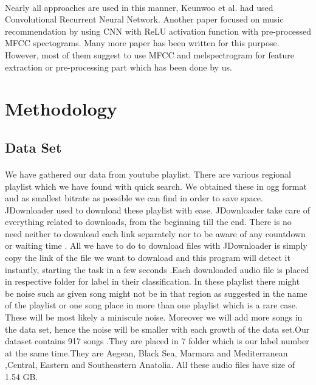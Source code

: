 \documentclass[10pt,twocolumn,letterpaper]{article}
\begin{document}
  \paragraph{}Nearly all approaches are used in this manner, Keunwoo et al.\cite{crnn_for_ml} had used Convolutional Recurrent Neural Network. Another paper focused on music recommendation  by using CNN with ReLU activation function with pre-processed MFCC spectograms\cite{cnn_recommendation}. Many more paper has been written for this purpose. However, most of them suggest to use MFCC and melspectrogram for feature extraction or pre-processing part which has been done by us.
  
  \section{Methodology}
  
  \subsection{Data Set}
  \paragraph{}We have gathered our data from youtube playlist. There are various regional playlist which we have found with quick search\cite{data_set}. We obtained these in ogg format and as smallest bitrate as possible we can find in order to save space. JDownloader\cite{jdownloader} used to download these playlist with ease.  JDownloader take care of everything related to downloads, from the beginning till the end. There is no need neither to download each link separately nor to be aware of any countdown or waiting time . All we have to do to download files with JDownloader is simply copy the link of the file we want to download and this program will detect it instantly, starting the task in a few seconds .Each downloaded audio file is placed in respective folder for label in their classification. In these playlist there might be noise
  such as given song might not be in that region as suggested in the name of the playlist or one song place in more than one playlist which is a rare case. These will be most likely a miniscule noise. Moreover we will add more songs in the
  data set, hence the noise will be smaller with each growth of the data set.Our dataset contains 917 songs .They are placed in 7 folder which is our label number at the same time.They are Aegean, Black Sea, Marmara and Mediterranean ,Central, Eastern and Southeastern Anatolia. All these audio files have size of 1.54 GB.
  
\end{document}
